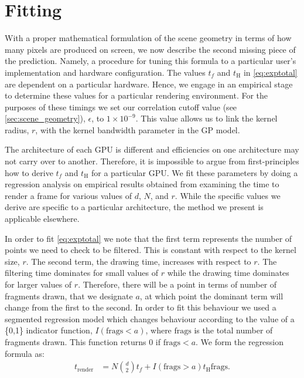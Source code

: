 \section{Fitting}
\label{sec:fitting}

With a proper mathematical formulation of the scene geometry in terms of how many pixels are produced on screen, we now describe the second missing piece of the prediction. Namely, a procedure for tuning this formula to a particular user's implementation and hardware configuration. 
The values $t_f$ and $t_\text{H}$ in \autoref{eq:exptotal} are dependent on a
particular hardware. Hence, we engage in an empirical stage to determine these
values for a particular rendering environment.
For the purposes of these timings we set our correlation cutoff value 
(see \autoref{sec:scene_geometry}),
$\epsilon$, to $1 \times 10^{-9}$. This value allows us to link the kernel radius,
$r$, with the kernel bandwidth parameter in the GP model.

The architecture of each GPU is different and efficiencies on one 
architecture may not carry over to another.
Therefore, it is
impossible to argue from first-principles how to derive $t_f$ and $t_\text{H}$ 
for a
particular GPU. We fit these parameters by doing a regression analysis
on empirical results obtained from examining the time to render a frame for
various values of $d$, $N$, and $r$. While the specific values we derive are 
specific to a particular architecture,
the method we present is applicable
elsewhere. 

In order to fit \autoref{eq:exptotal} we note that the first term
represents the number of points we need to check to be filtered. This is 
constant
with respect to the kernel size, $r$. The second term, the drawing
time, increases with respect to $r$. The filtering time dominates
for small values of $r$ while the drawing time dominates for larger values of 
$r$.
Therefore, there will be a point in terms of number of fragments drawn, that
we designate $a$, at which point the dominant term will change from the first to
the second. In order to fit this behaviour we used a segmented regression
model which changes behaviour according to the value of a \{0,1\} indicator
function, $I(\text{frags}<a)$, where $\text{frags}$ is the total number of 
fragments drawn. This 
function returns 0 if $\text{frags} < a$. We form the regression
formula as:
\begin{align}
  t_\text{render} &= N {d \choose 2} t_f + I(\text{frags} > a) t_\text{H} \text{frags}  \text{.}
  \label{eq:calib-acttotal-H}
\end{align}

